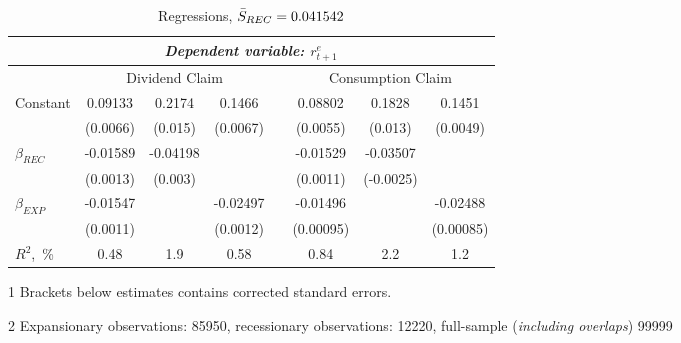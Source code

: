 \begin{table}[H]
\centering
\caption{Regressions, $\Bar{S}_{REC} = 0.041542$}  
\label{tab:regress1}
\begin{threeparttable}
\begin{tabular}{@{}lccccccc@{}}
\toprule
& \multicolumn{6}{c}{\textit{Dependent variable: $r^{e}_{t+1}$}} \\ 
\midrule
& \multicolumn{3}{c}{Dividend Claim} && \multicolumn{3}{c}{Consumption Claim} \\
\cmidrule(lr){2-4} \cmidrule(lr){6-8}
Constant & 0.09133  & 0.2174  & 0.1466  & & 0.08802 & 0.1828 & 0.1451 \\
         & (0.0066) & (0.015) & (0.0067)& &(0.0055) & (0.013)& (0.0049)\\
\addlinespace
$\beta_{REC}$ &-0.01589  & -0.04198 &&& -0.01529 & -0.03507 & \\
              & (0.0013) & (0.003)  &&& (0.0011) & (-0.0025) & \\
\addlinespace 
$\beta_{EXP}$ & -0.01547 & & -0.02497&& -0.01496 && -0.02488\\
              & (0.0011) & & (0.0012)&& (0.00095) && (0.00085)\\
\addlinespace
$R^2$,~\%         & 0.48 & 1.9 & 0.58 & & 0.84 & 2.2 & 1.2 \\
\bottomrule
\end{tabular}
\begin{tablenotes}\footnotesize{
\item[1] Brackets below estimates contains \citet{NW87} corrected standard errors. 
\item[2] Expansionary observations: 85950, recessionary observations: 12220, full-sample (\textit{including overlaps}) 99999}
\end{tablenotes}
\end{threeparttable}
\end{table}